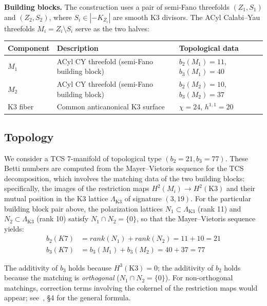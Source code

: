 \documentclass[11pt,a4paper]{article}
\newcommand{\Kseven}{K_7}
\newcommand{\rk}{\mathrm{rank}}
\theoremstyle{remark}
\def\Kseven{K7}%
\def\rk{rank}%
\begin{document}
\textbf{Building blocks.} The construction uses a pair of semi-Fano threefolds $(Z_1, S_1)$
and $(Z_2, S_2)$, where $S_i \in |{-}K_{Z_i}|$ are smooth K3 divisors. The ACyl Calabi--Yau
threefolds $M_i = Z_i \setminus S_i$ serve as the two halves:

\begin{table}[H]
\centering
\begin{tabular}{lll}
\toprule
\textbf{Component} & \textbf{Description} & \textbf{Topological data} \\
\midrule
$M_1$ & ACyl CY threefold (semi-Fano building block) & $b_2(M_1) = 11$, $b_3(M_1) = 40$ \\
$M_2$ & ACyl CY threefold (semi-Fano building block) & $b_2(M_2) = 10$, $b_3(M_2) = 37$ \\
K3 fiber & Common anticanonical K3 surface & $\chi = 24$, $h^{1,1} = 20$ \\
\bottomrule
\end{tabular}
\end{table}

\subsection{Topology}\label{sec:topology}

We consider a TCS 7-manifold of topological type $(b_2 = 21, b_3 = 77)$. These Betti
numbers are computed from the Mayer--Vietoris sequence for the TCS decomposition,
which involves the matching data of the two building blocks: specifically, the
images of the restriction maps $H^2(M_i) \to H^2(\mathrm{K3})$ and their mutual position in the
K3 lattice $\Lambda_{\mathrm{K3}}$ of signature $(3, 19)$. For the particular building block pair
above, the polarization lattices $N_1 \subset \Lambda_{\mathrm{K3}}$ (rank 11) and $N_2 \subset \Lambda_{\mathrm{K3}}$ (rank 10)
satisfy $N_1 \cap N_2 = \{0\}$, so that the Mayer--Vietoris sequence yields:
\begin{align}
b_2(\Kseven) &= \rk(N_1) + \rk(N_2) = 11 + 10 = 21 \label{eq:b2}\\
b_3(\Kseven) &= b_3(M_1) + b_3(M_2) = 40 + 37 = 77 \label{eq:b3}
\end{align}

The additivity of $b_3$ holds because $H^3(\mathrm{K3}) = 0$; the additivity of $b_2$ holds because
the matching is \textit{orthogonal} ($N_1 \cap N_2 = \{0\}$). For non-orthogonal matchings, correction
terms involving the cokernel of the restriction maps would appear; see~\cite{chnp2015}, \S4 for the
general formula.
\end{document}
